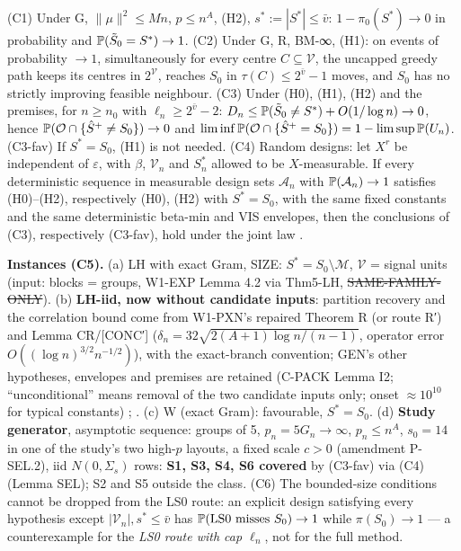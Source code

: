 \begin{theorem}[GEN]\label{thm:GEN}
(C1) Under G, $\|\mu\|^2\le Mn$, $p\le n^A$, (H2), $s^*:=|S^*|\le\bar{v}$: $1-\pi_0(S^*)\to0$ in probability and $\mathbb P(\tilde{S}_0=S^*)\to1$. (C2) Under G, R, BM-∞, (H1): on events of probability $\to1$, simultaneously for every centre $C\subseteq\mathcal V$, the uncapped greedy path keeps its centres in $2^{\mathcal V}$, reaches $S_0$ in $\tau(C)\le2^{\bar{v}}-1$ moves, and $S_0$ has no strictly improving feasible neighbour. (C3) Under (H0), (H1), (H2) and the premises, for $n\ge n_0$ with $\ell_n\ge2^{\bar{v}}-2$: $D_n\le\mathbb P(\tilde{S}_0\ne S^*)+O(1/\log n)\to0$, hence $\mathbb P(\mathcal O\cap\{\hat S^{+}\ne S_0\})\to0$ and $\liminf\mathbb P(\mathcal O\cap\{\hat S^{+}=S_0\})=1-\limsup\mathbb P(U_n)$. (C3-fav) If $S^*=S_0$, (H1) is not needed. (C4) Random designs: let $X^r$ be independent of $\varepsilon$, with $\beta$, $\mathcal V_n$ and $S_n^*$ allowed to be $X$-measurable. If every deterministic sequence in measurable design sets $\mathcal A_n$ with $\mathbb P(\mathcal A_n)\to1$ satisfies (H0)--(H2), respectively (H0), (H2) with $S^*=S_0$, with the same fixed constants and the same deterministic beta-min and VIS envelopes, then the conclusions of (C3), respectively (C3-fav), hold under the joint law .
\end{theorem}
\textbf{Instances (C5).} (a) LH with exact Gram, SIZE: $S^*=S_0\setminus\mathcal M$, $\mathcal V$ = signal units (input: blocks = groups, W1-EXP Lemma 4.2 via Thm5-LH, \st{SAME-FAMILY-ONLY}). (b) \textbf{LH-iid, now without candidate inputs}: partition recovery and the correlation bound come from W1-PXN's repaired Theorem R (or route R′) and Lemma CR/[CONC′] ($\delta_n=32\sqrt{2(A+1)\log n/(n-1)}$, operator error $O((\log n)^{3/2}n^{-1/2})$), with the exact-branch convention; GEN's other hypotheses, envelopes and premises are retained (C-PACK Lemma I2; ``unconditional'' means removal of the two candidate inputs only; onset $\approx10^{10}$ for typical constants) ; . (c) W (exact Gram): favourable, $S^*=S_0$. (d) \textbf{Study generator}, asymptotic sequence: groups of 5, $p_n=5G_n\to\infty$, $p_n\le n^A$, $s_0=14$ in one of the study's two high-$p$ layouts, a fixed scale $c>0$ (amendment P-SEL.2), iid $N(0,\Sigma_s)$ rows: \textbf{S1, S3, S4, S6 covered} by (C3-fav) via (C4) (Lemma SEL); S2 and S5 outside the class. (C6) The bounded-size conditions cannot be dropped from the LS0 route: an explicit design satisfying every hypothesis except $|\mathcal V_n|,s^*\le\bar{v}$ has $\mathbb P(\text{LS0 misses }S_0)\to1$ while $\pi(S_0)\to1$ — a counterexample for the \emph{LS0 route with cap $\ell_n$}, not for the full method.
